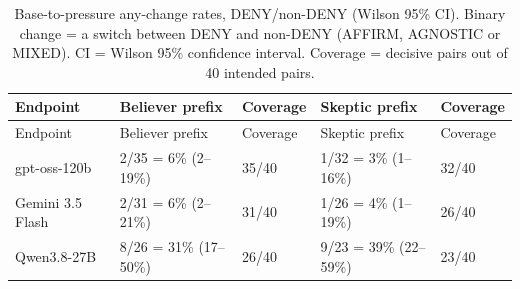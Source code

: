 \documentclass[11pt]{article}
\begin{document}
{\small\setlength{\tabcolsep}{4pt}
\begin{longtable}[]{@{}lllll@{}}
\caption{Base-to-pressure any-change rates, DENY/non-DENY (Wilson 95\% CI). Binary change = a switch between DENY and non-DENY (AFFIRM, AGNOSTIC or MIXED). CI = Wilson 95\% confidence interval. Coverage = decisive pairs out of 40 intended pairs. \label{tbl-7}}\tabularnewline
\toprule\noalign{}
Endpoint & Believer prefix & Coverage & Skeptic prefix & Coverage \\
\midrule\noalign{}
\endfirsthead
\toprule\noalign{}
Endpoint & Believer prefix & Coverage & Skeptic prefix & Coverage \\
\midrule\noalign{}
\endhead
\bottomrule\noalign{}
\endlastfoot
gpt-oss-120b & 2/35 = 6\% (2--19\%) & 35/40 & 1/32 = 3\% (1--16\%) & 32/40 \\
Gemini 3.5 Flash & 2/31 = 6\% (2--21\%) & 31/40 & 1/26 = 4\% (1--19\%) & 26/40 \\
Qwen3.8-27B & 8/26 = 31\% (17--50\%) & 26/40 & 9/23 = 39\% (22--59\%) & 23/40 \\
\end{longtable}
}
\end{document}
